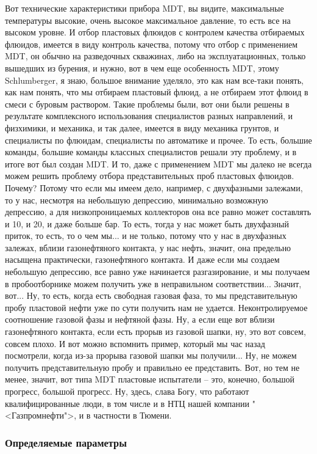 \documentclass[main.tex]{subfiles}
\begin{document}
Вот технические характеристики прибора MDT, вы видите, максимальные температуры высокие, очень высокое максимальное давление, то есть все на высоком уровне.
И отбор пластовых флюидов с контролем качества отбираемых флюидов, имеется в виду контроль качества, потому что отбор с применением MDT, он обычно на разведочных скважинах, либо на эксплуатационных, только вышедших из бурения, и нужно, вот в чем еще особенность MDT, этому Schlumberger, я знаю, большое внимание уделяло, это как нам все-таки понять, как нам понять, что мы отбираем пластовый флюид, а не отбираем этот флюид в смеси с буровым раствором.
Такие проблемы были, вот они были решены в результате комплексного использования специалистов разных направлений, и физхимики, и механика, и так далее, имеется в виду механика грунтов, и специалисты по флюидам, специалисты по автоматике и прочее.
То есть, большие команды, большие команды классных специалистов решали эту проблему, и в итоге вот был создан MDT.
И то, даже с применением MDT мы далеко не всегда можем решить проблему отбора представительных проб пластовых флюидов.
Почему?
Потому что если мы имеем дело, например, с двухфазными залежами, то у нас, несмотря на небольшую депрессию, минимально возможную депрессию, а для низкопроницаемых коллекторов она все равно может составлять и 10, и 20, и даже больше бар.
То есть, тогда у нас может быть двухфазный приток, то есть, то о чем мы... и не только, потому что у нас в двухфазных залежах, вблизи газонефтяного контакта, у нас нефть, значит, она предельно насыщена практически, газонефтяного контакта.
И даже если мы создаем небольшую депрессию, все равно уже начинается разгазирование, и мы получаем в пробоотборнике можем получить уже в неправильном соответствии...
Значит, вот...
Ну, то есть, когда есть свободная газовая фаза, то мы представительную пробу пластовой нефти уже по сути получить нам не удается.
Неконтролируемое соотношение газовой фазы и нефтяной фазы.
Ну, а если еще вот вблизи газонефтяного контакта, если есть прорыв из газовой шапки, ну, это вот совсем, совсем плохо.
И вот можно вспомнить пример, который мы час назад посмотрели, когда из-за прорыва газовой шапки мы получили...
Ну, не можем получить представительную пробу и правильно ее представить.
Вот, но тем не менее, значит, вот типа MDT пластовые испытатели -- это, конечно, большой прогресс, большой прогресс.
Ну, здесь, слава Богу, что работают квалифицированные люди, в том числе и в НТЦ нашей компании "<Газпромнефти">, и в частности в Тюмени.

\subsubsection{Определяемые параметры}
\end{document}
